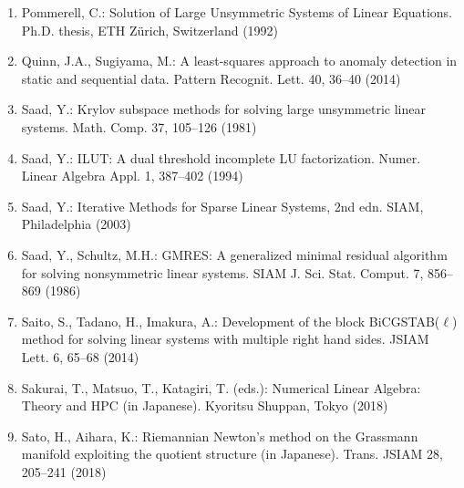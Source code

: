 \begin{enumerate}[label=\arabic*.,ref=\arabic*,leftmargin=3em]
\item\label{bib:source-147}Pommerell, C.: Solution of Large Unsymmetric Systems of Linear Equations. Ph.D. thesis, ETH Zürich, Switzerland (1992)

\item\label{bib:source-148}Quinn, J.A., Sugiyama, M.: A least-squares approach to anomaly detection in static and sequential data. Pattern Recognit. Lett. 40, 36–40 (2014)

\item\label{bib:source-149}Saad, Y.: Krylov subspace methods for solving large unsymmetric linear systems. Math. Comp. 37, 105–126 (1981)

\item\label{bib:source-150}Saad, Y.: ILUT: A dual threshold incomplete LU factorization. Numer. Linear Algebra Appl. 1, 387–402 (1994)

\item\label{bib:source-151}Saad, Y.: Iterative Methods for Sparse Linear Systems, 2nd edn. SIAM, Philadelphia (2003)

\item\label{bib:source-152}Saad, Y., Schultz, M.H.: GMRES: A generalized minimal residual algorithm for solving nonsymmetric linear systems. SIAM J. Sci. Stat. Comput. 7, 856–869 (1986)

\item\label{bib:source-153}Saito, S., Tadano, H., Imakura, A.: Development of the block BiCGSTAB($\ell$) method for solving linear systems with multiple right hand sides. JSIAM Lett. 6, 65–68 (2014)

\item\label{bib:source-154}Sakurai, T., Matsuo, T., Katagiri, T. (eds.): Numerical Linear Algebra: Theory and HPC (in Japanese). Kyoritsu Shuppan, Tokyo (2018)

\item\label{bib:source-155}Sato, H., Aihara, K.: Riemannian Newton’s method on the Grassmann manifold exploiting the quotient structure (in Japanese). Trans. JSIAM 28, 205–241 (2018)


\end{enumerate}
